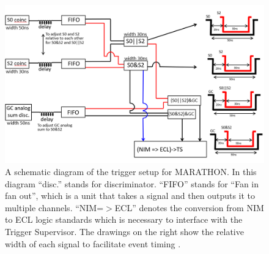 \begin{figure}
\begin{center}
	\includegraphics[width=\textwidth]{./setup/fig/trigger_diagram.png}
	\caption{A schematic diagram of the trigger setup for MARATHON. In this diagram ``disc.'' stands for discriminator. ``FIFO'' stands for ``Fan in fan out'', which is a unit that takes a signal and then outputs it to multiple channels. ``NIM=$>$ECL'' denotes the conversion from NIM to ECL logic standards which is necessary to interface with the Trigger Supervisor. The drawings on the right show the relative width of each signal to facilitate event timing \cite{Rey}.}
	\label{fig:trig_schem}
\end{center}
\end{figure}